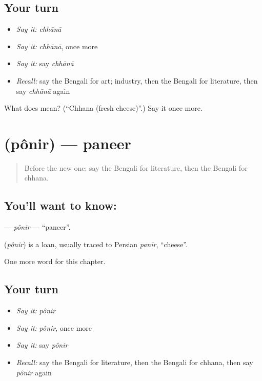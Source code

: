 \subsection*{Your turn}
\begin{itemize}
\raggedright
  \item \emph{Say it:} \emph{chhānā}
  \item \emph{Say it:} \emph{chhānā}, once more
  \item \emph{Say it:} say \emph{chhānā}
  \item \emph{Recall:} say the Bengali for art; industry, then the Bengali for literature, then say \emph{chhānā} again
\end{itemize}

\begin{tcolorbox}[breakable,colback=teal!4,colframe=teal!35!black,title={Before you move on}]
What does  mean? (\textquotedblleft{}Chhana (fresh cheese)\textquotedblright{}.) Say it once more.
\end{tcolorbox}
\section[\texorpdfstring{\bn{পনির} (pônir)}{পনির (pônir)}]{ (pônir) — paneer}

\label{lesson:BN-C257-ponir}



\begin{quote}
Before the new one: say the Bengali for literature, then the Bengali for chhana.
\end{quote}

\subsection*{You'll want to know: }
\textbf{} — \emph{pônir} — \textquotedblleft{}paneer\textquotedblright{}.

\begin{cousinweb}
\textbf{} (\emph{pônir}) is a loan, usually traced to Persian \emph{panīr}, \textquotedblleft{}cheese\textquotedblright{}.
\end{cousinweb}

\begin{grammarlens}[title={What you've built}]
One more word for this chapter.
\end{grammarlens}

\subsection*{Your turn}
\begin{itemize}
\raggedright
  \item \emph{Say it:} \emph{pônir}
  \item \emph{Say it:} \emph{pônir}, once more
  \item \emph{Say it:} say \emph{pônir}
  \item \emph{Recall:} say the Bengali for literature, then the Bengali for chhana, then say \emph{pônir} again
\end{itemize}


